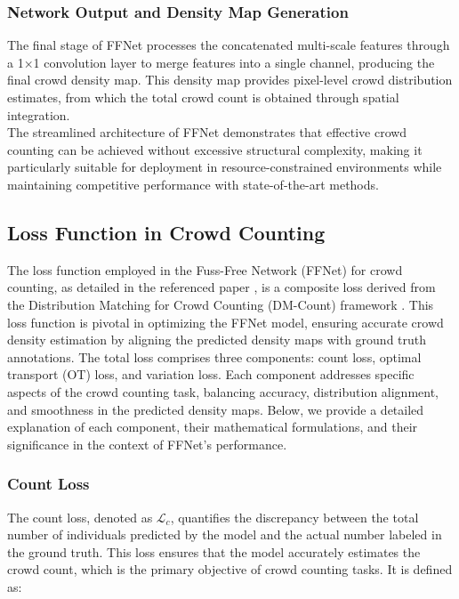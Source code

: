 \subsubsection{Network Output and Density Map Generation}
The final stage of FFNet processes the concatenated multi-scale features through a 1×1 convolution layer to merge features into a single channel, producing the final crowd density map. This density map provides pixel-level crowd distribution estimates, from which the total crowd count is obtained through spatial integration.\\
The streamlined architecture of FFNet demonstrates that effective crowd counting can be achieved without excessive structural complexity, making it particularly suitable for deployment in resource-constrained environments while maintaining competitive performance with state-of-the-art methods.

\subsection{Loss Function in Crowd Counting}

The loss function employed in the Fuss-Free Network (FFNet) for crowd counting, as detailed in the referenced paper \cite{gao2025effectiveness}, is a composite loss derived from the Distribution Matching for Crowd Counting (DM-Count) framework \cite{wang2020distribution}. This loss function is pivotal in optimizing the FFNet model, ensuring accurate crowd density estimation by aligning the predicted density maps with ground truth annotations. The total loss comprises three components: count loss, optimal transport (OT) loss, and variation loss. Each component addresses specific aspects of the crowd counting task, balancing accuracy, distribution alignment, and smoothness in the predicted density maps. Below, we provide a detailed explanation of each component, their mathematical formulations, and their significance in the context of FFNet's performance.

\subsubsection{Count Loss}
The count loss, denoted as $\mathcal{L}_c$, quantifies the discrepancy between the total number of individuals predicted by the model and the actual number labeled in the ground truth. This loss ensures that the model accurately estimates the crowd count, which is the primary objective of crowd counting tasks. It is defined as:

